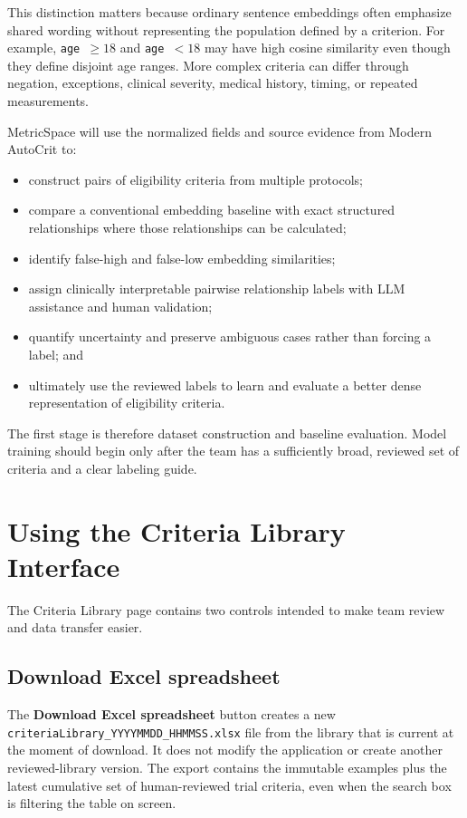 \documentclass[11pt]{article}
\newcommand{\code}[1]{\texttt{#1}}
\begin{document}
This distinction matters because ordinary sentence embeddings often emphasize shared wording without representing the population defined by a criterion. For example, \texttt{age $\geq 18$} and \texttt{age $<18$} may have high cosine similarity even though they define disjoint age ranges. More complex criteria can differ through negation, exceptions, clinical severity, medical history, timing, or repeated measurements.

MetricSpace will use the normalized fields and source evidence from Modern AutoCrit to:

\begin{itemize}
    \item construct pairs of eligibility criteria from multiple protocols;
    \item compare a conventional embedding baseline with exact structured relationships where those relationships can be calculated;
    \item identify false-high and false-low embedding similarities;
    \item assign clinically interpretable pairwise relationship labels with LLM assistance and human validation;
    \item quantify uncertainty and preserve ambiguous cases rather than forcing a label; and
    \item ultimately use the reviewed labels to learn and evaluate a better dense representation of eligibility criteria.
\end{itemize}

The first stage is therefore dataset construction and baseline evaluation. Model training should begin only after the team has a sufficiently broad, reviewed set of criteria and a clear labeling guide.

\section{Using the Criteria Library Interface}

The Criteria Library page contains two controls intended to make team review and data transfer easier.

\subsection{Download Excel spreadsheet}

The \textbf{Download Excel spreadsheet} button creates a new \code{criteriaLibrary\_YYYYMMDD\_HHMMSS.xlsx} file from the library that is current at the moment of download. It does not modify the application or create another reviewed-library version. The export contains the immutable examples plus the latest cumulative set of human-reviewed trial criteria, even when the search box is filtering the table on screen.
\end{document}
